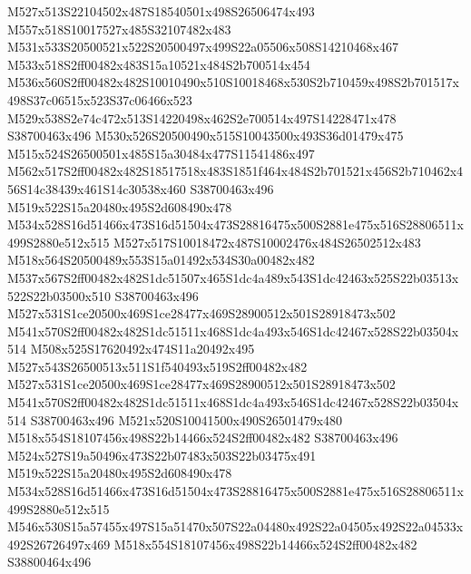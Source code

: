 \documentclass{article}
\begin{document}
\begin{multicols}{2}






M527x513S22104502x487S18540501x498S26506474x493 M557x518S10017527x485S32107482x483 M531x533S20500521x522S20500497x499S22a05506x508S14210468x467 M533x518S2ff00482x483S15a10521x484S2b700514x454 M536x560S2ff00482x482S10010490x510S10018468x530S2b710459x498S2b701517x498S37c06515x523S37c06466x523 M529x538S2e74c472x513S14220498x462S2e700514x497S14228471x478 S38700463x496 M530x526S20500490x515S10043500x493S36d01479x475 M515x524S26500501x485S15a30484x477S11541486x497 M562x517S2ff00482x482S18517518x483S1851f464x484S2b701521x456S2b710462x456S14c38439x461S14c30538x460 S38700463x496 M519x522S15a20480x495S2d608490x478 M534x528S16d51466x473S16d51504x473S28816475x500S2881e475x516S28806511x499S2880e512x515 M527x517S10018472x487S10002476x484S26502512x483 M518x564S20500489x553S15a01492x534S30a00482x482 M537x567S2ff00482x482S1dc51507x465S1dc4a489x543S1dc42463x525S22b03513x522S22b03500x510 S38700463x496 M527x531S1ce20500x469S1ce28477x469S28900512x501S28918473x502 M541x570S2ff00482x482S1dc51511x468S1dc4a493x546S1dc42467x528S22b03504x514 M508x525S17620492x474S11a20492x495 M527x543S26500513x511S1f540493x519S2ff00482x482 M527x531S1ce20500x469S1ce28477x469S28900512x501S28918473x502 M541x570S2ff00482x482S1dc51511x468S1dc4a493x546S1dc42467x528S22b03504x514 S38700463x496 M521x520S10041500x490S26501479x480 M518x554S18107456x498S22b14466x524S2ff00482x482 S38700463x496 M524x527S19a50496x473S22b07483x503S22b03475x491 M519x522S15a20480x495S2d608490x478 M534x528S16d51466x473S16d51504x473S28816475x500S2881e475x516S28806511x499S2880e512x515 M546x530S15a57455x497S15a51470x507S22a04480x492S22a04505x492S22a04533x492S26726497x469 M518x554S18107456x498S22b14466x524S2ff00482x482 S38800464x496


\end{multicols}
\end{document}

